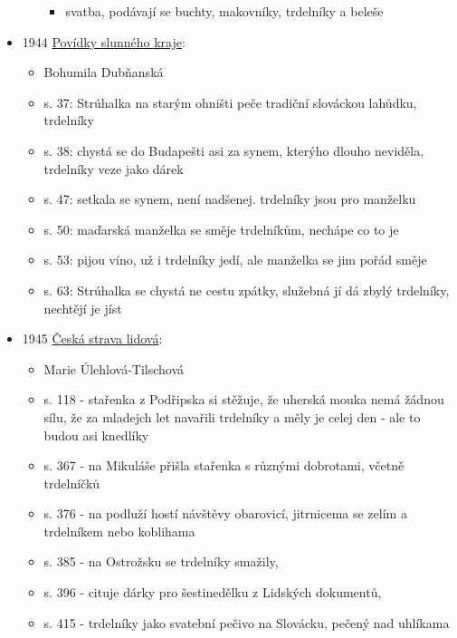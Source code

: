 \begin{itemize}
\begin{itemize}
    \begin{itemize}
    \tightlist
    \item
      svatba, podávají se buchty, makovníky, trdelníky a beleše
    \end{itemize}
  \end{itemize}
\item
  1944
  \href{https://ceskadigitalniknihovna.cz/uuid/uuid:78576090-e45a-11e5-8d5f-005056827e51}{Povídky
  slunného kraje}:

  \begin{itemize}
  \tightlist
  \item
    Bohumila Dubňanská
  \item
    s. 37: Strúhalka na starým ohništi peče tradiční slováckou lahůdku,
    trdelníky
  \item
    s. 38: chystá se do Budapešti asi za synem, kterýho dlouho neviděla,
    trdelníky veze jako dárek
  \item
    s. 47: setkala se synem, není nadšenej. trdelníky jsou pro manželku
  \item
    s. 50: maďarská manželka se směje trdelníkům, nechápe co to je
  \item
    s. 53: pijou víno, už i trdelníky jedí, ale manželka se jim pořád
    směje
  \item
    s. 63: Strúhalka se chystá ne cestu zpátky, služebná jí dá zbylý
    trdelníky, nechtějí je jíst
  \end{itemize}
\item
  1945
  \href{https://ceskadigitalniknihovna.cz/view/uuid:89562bf0-7962-11e5-9690-005056827e51?page=uuid\%3A521d38f0-92de-11e5-bf6c-005056825209&fulltext=trdeln\%C3\%ADk\%20OR\%20trdeln\%C3\%ADky\%20OR\%20trdeln\%C3\%ADk\%C5\%AF&source=mzk}{Česká
  strava lidová}:

  \begin{itemize}
  \tightlist
  \item
    Marie Úlehlová-Tilschová
  \item
    s. 118 - stařenka z Podřipska si stěžuje, že uherská mouka nemá
    žádnou sílu, že za mladejch let navařili trdelníky a měly je celej
    den - ale to budou asi knedlíky
  \item
    s. 367 - na Mikuláše přišla stařenka s různými dobrotami, včetně
    trdelníčků
  \item
    s. 376 - na podluží hostí návštěvy obarovicí, jitrnicema se zelím a
    trdelníkem nebo koblihama
  \item
    s. 385 - na Ostrožsku se trdelníky smažily,
  \item
    s. 396 - cituje dárky pro šestinedělku z Lidských dokumentů,
  \item
    s. 415 - trdelníky jako svatební pečivo na Slovácku, pečený nad
    uhlíkama


\end{itemize}
\end{itemize}
